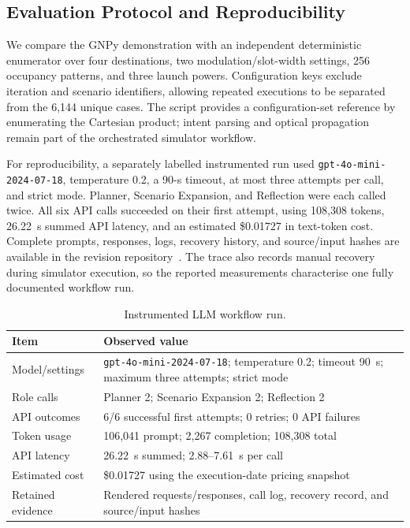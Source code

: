 \documentclass[9pt,twocolumn,twoside]{osajnl}
\begin{document}
\subsection{Evaluation Protocol and Reproducibility}

We compare the GNPy demonstration with an independent deterministic enumerator over four destinations, two modulation/slot-width settings, 256 occupancy patterns, and three launch powers. Configuration keys exclude iteration and scenario identifiers, allowing repeated executions to be separated from the 6,144 unique cases. The script provides a configuration-set reference by enumerating the Cartesian product; intent parsing and optical propagation remain part of the orchestrated simulator workflow.

For reproducibility, a separately labelled instrumented run used \texttt{gpt-4o-mini-2024-07-18}, temperature 0.2, a 90-s timeout, at most three attempts per call, and strict mode. Planner, Scenario Expansion, and Reflection were each called twice. All six API calls succeeded on their first attempt, using 108,308 tokens, 26.22~s summed API latency, and an estimated \$0.01727 in text-token cost. Complete prompts, responses, logs, recovery history, and source/input hashes are available in the revision repository~\cite{JOCN_revision_code_2026}. The trace also records manual recovery during simulator execution, so the reported measurements characterise one fully documented workflow run.


\begin{table}[t]
\caption{Instrumented LLM workflow run.}
\label{tab:llm_trace}
\centering
\small
\setlength{\tabcolsep}{4pt}
\begin{tabularx}{\columnwidth}{p{2.15cm}X}
\hline
Item & Observed value \\
\hline
Model/settings & \texttt{gpt-4o-mini-2024-07-18}; temperature 0.2; timeout 90~s; maximum three attempts; strict mode \\
Role calls & Planner 2; Scenario Expansion 2; Reflection 2 \\
API outcomes & 6/6 successful first attempts; 0 retries; 0 API failures \\
Token usage & 106,041 prompt; 2,267 completion; 108,308 total \\
API latency & 26.22~s summed; 2.88--7.61~s per call \\
Estimated cost & \$0.01727 using the execution-date pricing snapshot \\
Retained evidence & Rendered requests/responses, call log, recovery record, and source/input hashes \\
\hline
\end{tabularx}
\end{table}
\end{document}
